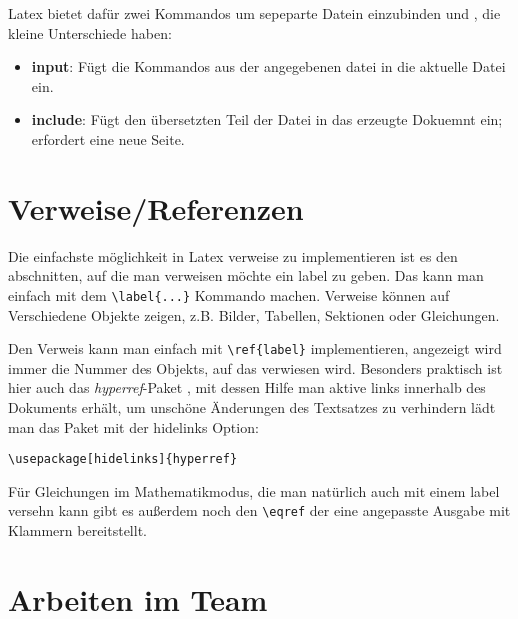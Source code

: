 \documentclass[a4paper, parskip=half]{scrartcl}
\newcommand{\myPackage}[1]{%
  \textit{#1}-Paket%
}
\begin{document}
Latex bietet dafür zwei Kommandos um sepeparte Datein einzubinden \verb++ und \verb++,
die kleine Unterschiede haben:
\begin{itemize}
  \item \textbf{input}: Fügt die Kommandos aus der angegebenen datei in die aktuelle Datei ein.
  \item \textbf{include}: Fügt den übersetzten Teil der Datei in das erzeugte Dokuemnt ein; erfordert eine neue
    Seite. 
\end{itemize}

\section{Verweise/Referenzen}
Die einfachste möglichkeit in Latex verweise zu implementieren ist es den abschnitten, auf die man verweisen
möchte ein label zu geben. Das kann man einfach mit dem \verb+\label{...}+ Kommando machen. Verweise können auf
Verschiedene Objekte zeigen, z.B. Bilder, Tabellen, Sektionen oder Gleichungen.

Den Verweis kann man einfach mit \verb+\ref{label}+ implementieren, angezeigt wird immer die Nummer des Objekts,
auf das verwiesen wird. Besonders praktisch ist hier auch das \myPackage{hyperref}, mit dessen Hilfe man aktive
links innerhalb des Dokuments erhält, um unschöne Änderungen des Textsatzes zu verhindern lädt man das Paket mit
der hidelinks Option:
\begin{verbatim}
\usepackage[hidelinks]{hyperref}
\end{verbatim}

Für Gleichungen im Mathematikmodus, die man natürlich auch mit einem label versehn kann gibt es außerdem noch
den \verb+\eqref+ der eine angepasste Ausgabe mit Klammern bereitstellt. 

\section{Arbeiten im Team}
\end{document}
